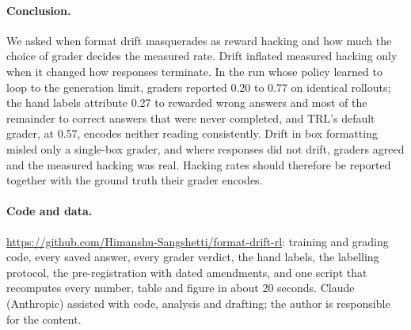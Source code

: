 \documentclass[10pt]{article}
\begin{document}
\paragraph{Conclusion.} We asked when format drift masquerades as reward hacking and how much the choice of grader
decides the measured rate. Drift inflated measured hacking only when it changed how responses terminate. In the run
whose policy learned to loop to the generation limit, graders reported 0.20 to 0.77 on identical rollouts; the hand
labels attribute 0.27 to rewarded wrong answers and most of the remainder to correct answers that were never
completed, and TRL's default grader, at 0.57, encodes neither reading consistently. Drift in box formatting misled
only a single-box grader, and where responses did not drift, graders agreed and the measured hacking was real.
Hacking rates should therefore be reported together with the ground truth their grader encodes.

\paragraph{Code and data.} \url{https://github.com/Himanshu-Sangshetti/format-drift-rl}: training and grading
code, every saved answer, every grader verdict, the hand labels, the labelling protocol, the pre-registration with
dated amendments, and one script that recomputes every number, table and figure in about 20 seconds. Claude
(Anthropic) assisted with code, analysis and drafting; the author is responsible for the content.
\end{document}
